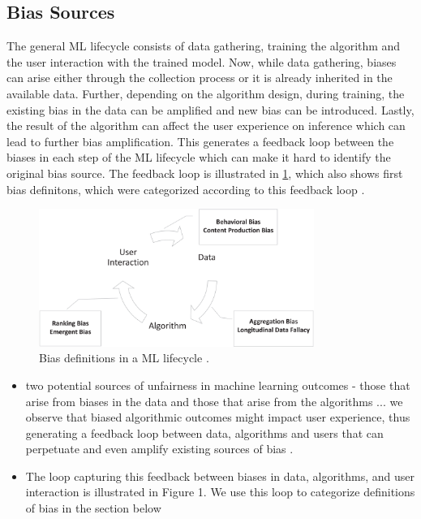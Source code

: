 \documentclass[12pt, a4paper, oneside]{book}   	%
\newif\ifrawcitationactive
\newcommand{\rawcitationusedstart}{\color{violet}}
\newcommand{\rawcitationusedend}{%
	\ifrawcitationactive
	\color{purple}  %
	\else
	\color{black}  %
	\fi
}
\begin{document}
			\subsection{Bias Sources}
			The general ML lifecycle consists of data gathering, training the algorithm and the user interaction with the trained model. Now, while data gathering, biases can arise either through the collection process or it is already inherited in the available data. Further, depending on the algorithm design, during training, the existing bias in the data can be amplified and new bias can be introduced. Lastly, the result of the algorithm can affect the user experience on inference which can lead to further bias amplification. This generates a feedback loop between the biases in each step of the ML lifecycle which can make it hard to identify the original bias source. The feedback loop is illustrated in \ref{fig:bias_definitions_ML_lifecycle}, which also shows first bias definitons, which were categorized according to this feedback loop \autocite{Mehrabi_2021}.
			
			\begin{figure}[H]
				\centering
				\includegraphics[width=0.8\textwidth]{figures/BiasCategoriesInMLLifecycle.png}
				\caption{Bias definitions in a ML lifecycle \autocite{Mehrabi_2021}.}
				\label{fig:bias_definitions_ML_lifecycle}
			\end{figure}
			
			\rawcitationusedstart

			\begin{itemize}
				\item two potential sources of unfairness in machine learning outcomes - those that arise from biases in the data and those that arise from the algorithms ... we observe that biased algorithmic outcomes might impact user experience, thus generating a feedback loop between data, algorithms and users that can perpetuate and even amplify existing sources of bias \autocite{Mehrabi_2021}.
				\item The loop capturing this feedback between biases in data, algorithms, and user interaction is illustrated in Figure 1. We use this loop to categorize definitions of bias in the section below \autocite{Mehrabi_2021}
			\end{itemize}
			\rawcitationusedend
			
\end{document}
